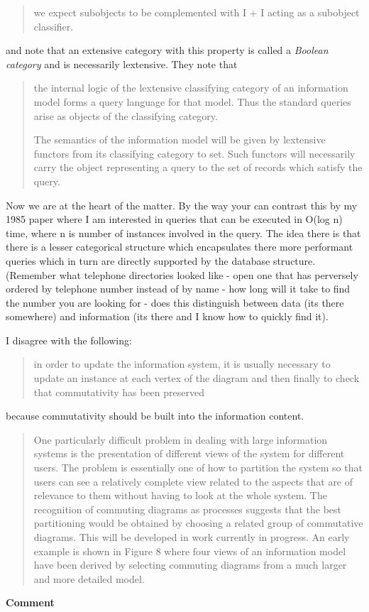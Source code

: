 \documentclass[10pt,a4paper]{scrartcl}
\begin{document}
\begin{quote}
we expect subobjects to be complemented with I + I acting as
a subobject classifier. 
\end{quote}
and note that an extensive category with this property is called a
\textit{Boolean category} and is necessarily lextensive. 
They note that
\begin{quote}
 the internal logic of the lextensive
classifying category of an information model forms a query language for that
model. Thus the standard queries arise as objects of the classifying category.

The semantics of the information model will be given by lextensive functors
from its classifying category to set. Such functors will necessarily carry the
object representing a query to the set of records which satisfy the query.
\end{quote}
Now we are at the heart of the matter. By the way your can contrast this by my 1985 paper where I am interested in queries that can
be executed in O(log n) time, where n is number of instances involved in the query. The idea there is that there is a lesser
categorical structure which encapsulates there more performant queries which in turn are directly supported by the database structure.
(Remember what telephone directories looked like - open one that has perversely ordered by telephone number instead of by name -
how long will it take to find the number you are looking for - does this distinguish between data (its there somewhere) and information
(its there and I know how to quickly find it).  


I disagree with the following:
\begin{quote}
in order to update the information system, it is usually necessary to
update an instance at each vertex of the diagram and then finally to check that
commutativity has been preserved
\end{quote}
because commutativity should be built into the information content.

\begin{quote}
One particularly difficult problem in dealing with large information systems
is the presentation of different views of the system for different users. The
problem is essentially one of how to partition the system so that users can see
a relatively complete view related to the aspects that are of relevance to them
without having to look at the whole system. The recognition of commuting
diagrams as processes suggests that the best partitioning would be obtained
by choosing a related group of commutative diagrams. This will be developed
in work currently in progress. An early example is shown in Figure 8 where
four views of an information model have been derived by selecting commuting
diagrams from a much larger and more detailed model.
\end{quote}
\textbf{Comment}\\
\end{document}
